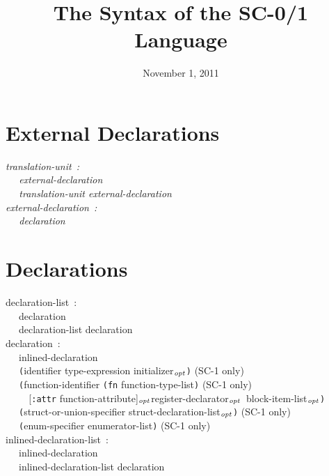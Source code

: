 \documentclass[a4]{article}
\title{The Syntax of the SC-0/1 Language}
\date{November 1, 2011}
\def\|{\verb|} %|
\newcommand{\opt}{$_{{\it opt}}$}
\newcommand{\scoo}{{\rm \hfill (SC-1 only)}}
\begin{document}
\maketitle
\small
\section{External Declarations}
\it \noindent
translation-unit{\rm \ :}\\
\|  | external-declaration \\
\|  | translation-unit external-declaration \\


\noindent
external-declaration{\rm \ :} \\
\|  | declaration \\
\rm 
\section{Declarations}
\it 

\noindent
declaration-list{\rm \ :} \\
\|  | declaration \\
\|  | declaration-list declaration \\ 

\noindent
declaration{\rm \ :} \\
\|  | inlined-declaration \\
\|  | {\tt (}identifier type-expression initializer\opt{\tt )} \scoo \\
\|  | {\tt (}function-identifier {\tt (fn} function-type-list{\tt )} \scoo\\
\|    | {\rm [}{\tt :attr} function-attribute{\rm ]}\opt register-declarator\opt\ block-item-list\opt{\tt )} \\ 
\|  | {\tt (}struct-or-union-specifier struct-declaration-list\opt{\tt )} \scoo \\
\|  | {\tt (}enum-specifier enumerator-list{\tt )} \scoo \\

\noindent
inlined-declaration-list{\rm \ :} \\
\|  | inlined-declaration \\
\|  | inlined-declaration-list declaration \\ 
\end{document}
